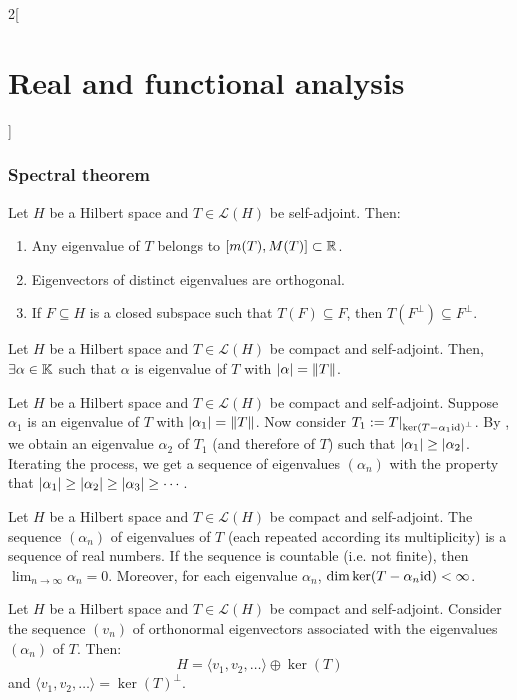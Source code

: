 \documentclass[../../../main_math.tex]{subfiles}
\begin{document}
\begin{multicols}{2}[\section{Real and functional analysis}]
  \subsubsection{Spectral theorem}
  \begin{proposition}
    Let $H$ be a Hilbert space and $T\in\mathcal{L}(H)$ be self-adjoint. Then:
    \begin{enumerate}
      \item Any eigenvalue of $T$ belongs to $[m(T),M(T)]\subset\mathbb{R}$.
      \item Eigenvectors of distinct eigenvalues are orthogonal.
      \item If $F\subseteq H$ is a closed subspace such that $T(F)\subseteq F$, then $T(F^\perp)\subseteq F^\perp$.
    \end{enumerate}
  \end{proposition}
  \begin{theorem}\label{RFA:spectraltheorem}
    Let $H$ be a Hilbert space and $T\in\mathcal{L}(H)$ be compact and self-adjoint. Then, $\exists \alpha\in \mathbb{K}$ such that $\alpha$ is eigenvalue of $T$ with $\abs{\alpha}=\left\|T\right\|$.
  \end{theorem}
  \begin{corollary}
    Let $H$ be a Hilbert space and $T\in\mathcal{L}(H)$ be compact and self-adjoint. Suppose $\alpha_1$ is an eigenvalue of $T$ with $\abs{\alpha_1}=\left\|T\right\|$. Now consider $T_1:=T|_{{\ker(T-\alpha_1\mathrm{id})}^\perp}$. By , we obtain an eigenvalue $\alpha_2$ of $T_1$ (and therefore of $T$) such that $\abs{\alpha_1}\geq \abs{\alpha_2}$. Iterating the process, we get a sequence of eigenvalues $(\alpha_n)$ with the property that $\abs{\alpha_1}\geq \abs{\alpha_2}\geq\abs{\alpha_3}\geq\cdots$.
  \end{corollary}
  \begin{theorem}
    Let $H$ be a Hilbert space and $T\in\mathcal{L}(H)$ be compact and self-adjoint. The sequence $(\alpha_n)$ of eigenvalues of $T$ (each repeated according its multiplicity) is a sequence of real numbers. If the sequence is countable (i.e. not finite), then $\displaystyle\lim_{n\to\infty}\alpha_n=0$. Moreover, for each eigenvalue $\alpha_n$, $\dim\ker(T-\alpha_n\mathrm{id})<\infty$.
  \end{theorem}
  \begin{lemma}
    Let $H$ be a Hilbert space and $T\in\mathcal{L}(H)$ be compact and self-adjoint. Consider the sequence $(v_n)$ of orthonormal eigenvectors associated with the eigenvalues $(\alpha_n)$ of $T$. Then: $$H=\langle v_1,v_2,\ldots\rangle\oplus \ker(T)$$ and $\langle v_1,v_2,\ldots\rangle={\ker(T)}^\perp$.

\end{lemma}
\end{multicols}
\end{document}
